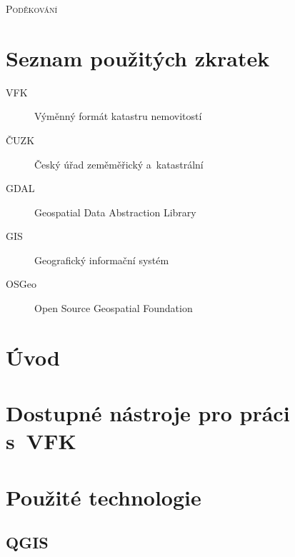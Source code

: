 \documentclass[a4paper,12pt,oneside]{book}
\begin{document}
\noindent
\textsc{\Large Poděkování}

\vspace{12pt}

\vspace{2cm}

\clearpage
\chapter*{Seznam použitých zkratek}
\thispagestyle{empty}

\begin{description}
\item[VFK] Výměnný formát katastru nemovitostí
\item[ČUZK] Český úřad zeměměřický a~katastrální
\item[GDAL] Geospatial Data Abstraction Library
\item[GIS] Geografický informační systém
\item[OSGeo] Open Source Geospatial Foundation
\end{description}


\clearpage
\rhead{{\rightmark}}		%
\tableofcontents
\thispagestyle{empty}

\clearpage
\pagestyle{fancy}		%
\setcounter{page}{1}   	%
\chapter*{Úvod}




\clearpage
\rhead{{\rightmark}}
\chapter{Dostupné nástroje pro práci s~VFK}


\clearpage
\chapter{Použité technologie}

\section{QGIS}
\end{document}
